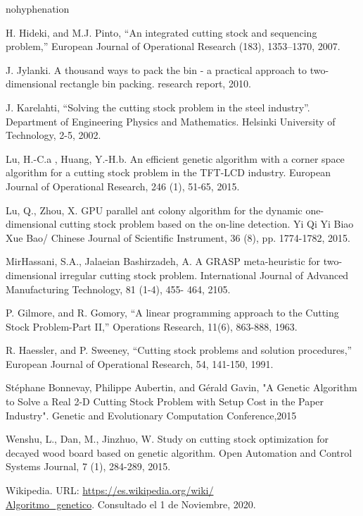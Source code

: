 \documentclass[a4paper,10pt,twocolumn]{article}
\begin{document}
\begin{hyphenrules}{nohyphenation}
\begin{thebibliography}{99}
	 H. Hideki, and M.J. Pinto, “An integrated cutting
	stock and sequencing problem,” European Journal of
	Operational Research (183), 1353–1370, 2007.
	
	 J. Jylanki. A thousand ways to pack the bin - a
	practical approach to two-dimensional rectangle bin
	packing. research report, 2010.
	
	J. Karelahti, “Solving the cutting stock problem in
	the steel industry”. Department of Engineering Physics
	and Mathematics. Helsinki University of Technology,
	2-5, 2002.
	
	  Lu, H.-C.a , Huang, Y.-H.b. An efficient genetic
	algorithm with a corner space algorithm for a cutting
	stock problem in the TFT-LCD industry. European
	Journal of Operational Research, 246 (1), 51-65, 2015.
	
	Lu, Q., Zhou, X. GPU parallel ant colony algorithm
	for the dynamic one-dimensional cutting stock problem
	based on the on-line detection. Yi Qi Yi Biao Xue Bao/
	Chinese Journal of Scientific Instrument, 36 (8), pp.
	1774-1782, 2015.
	
	 MirHassani, S.A., Jalaeian Bashirzadeh, A. A
	GRASP meta-heuristic for two-dimensional irregular
	cutting stock problem. International Journal of
	Advanced Manufacturing Technology, 81 (1-4), 455-
	464, 2105.
	
	 P. Gilmore, and R. Gomory, “A linear programming
	approach to the Cutting Stock Problem-Part II,”
	Operations Research, 11(6), 863-888, 1963.
	
	 R. Haessler, and P. Sweeney, “Cutting stock
	problems and solution procedures,” European Journal
	of Operational Research, 54, 141-150, 1991.
	
	 Stéphane Bonnevay, Philippe Aubertin, and Gérald Gavin, "A Genetic Algorithm to Solve a Real 2-D Cutting Stock
	Problem with Setup Cost in the Paper Industry". Genetic and Evolutionary Computation Conference,2015
	
	  Wenshu, L., Dan, M., Jinzhuo, W. Study on cutting
	stock optimization for decayed wood board based
	on genetic algorithm. Open Automation and Control
	Systems Journal, 7 (1), 284-289, 2015.
	
	 Wikipedia. URL: \href{https://es.wikipedia.org/wiki/Algoritmo\_genetico}
	{https://es.wikipedia.org/wiki/ \\Algoritmo\_genetico}.
	Consultado el 1 de Noviembre, 2020.

\end{thebibliography}


\label{end}
\end{hyphenrules}
\end{document}
